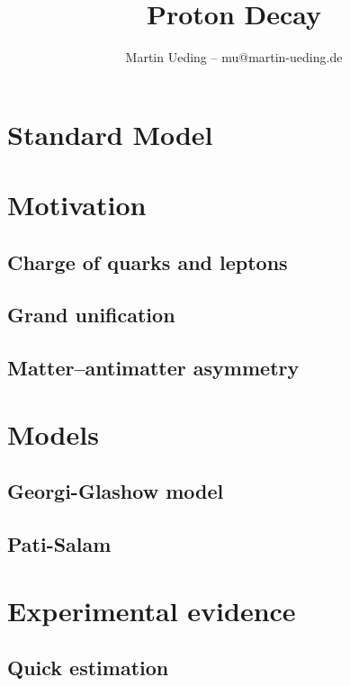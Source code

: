 \documentclass[english, fleqn]{beamer}
\title{Proton Decay}
\author{Martin Ueding -- mu@martin-ueding.de}
\begin{document}
\begin{frame}
    \titlepage
\end{frame}

\section{Standard Model}

\section{Motivation}

\subsection{Charge of quarks and leptons}

\subsection{Grand unification}

\subsection{Matter--antimatter asymmetry}

\section{Models}

\subsection{Georgi-Glashow model}

\subsection{Pati-Salam}

\begin{frame}
    \parencite{Wu/Proton_decay}
\end{frame}

\section{Experimental evidence}

\subsection{Quick estimation}
\end{document}
